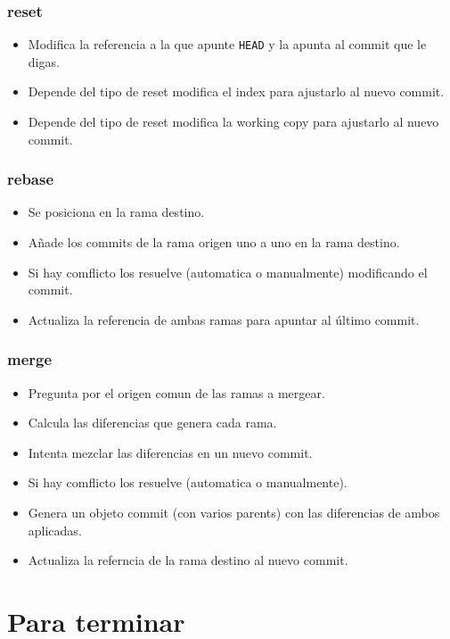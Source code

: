 \documentclass[10pt]{beamer}
\begin{document}
  \begin{frame}[containsverbatim]
    \frametitle{reset}
    \begin{itemize}
      \item Modifica la referencia a la que apunte \verb+HEAD+ y la apunta al commit que le digas.
      \item Depende del tipo de reset modifica el index para ajustarlo al nuevo commit.
      \item Depende del tipo de reset modifica la working copy para ajustarlo al nuevo commit.
    \end{itemize}
  \end{frame}

  \begin{frame}[containsverbatim]
    \frametitle{rebase}
    \begin{itemize}
      \item Se posiciona en la rama destino.
      \item Añade los commits de la rama origen uno a uno en la rama destino.
      \item Si hay comflicto los resuelve (automatica o manualmente) modificando el commit.
      \item Actualiza la referencia de ambas ramas para apuntar al último commit.
    \end{itemize}
  \end{frame}

  \begin{frame}[containsverbatim]
    \frametitle{merge}
    \begin{itemize}
      \item Pregunta por el origen comun de las ramas a mergear.
      \item Calcula las diferencias que genera cada rama.
      \item Intenta mezclar las diferencias en un nuevo commit.
      \item Si hay comflicto los resuelve (automatica o manualmente).
      \item Genera un objeto commit (con varios parents) con las diferencias de ambos aplicadas.
      \item Actualiza la referncia de la rama destino al nuevo commit.
    \end{itemize}
  \end{frame}

  \section*{Para terminar}
\end{document}
